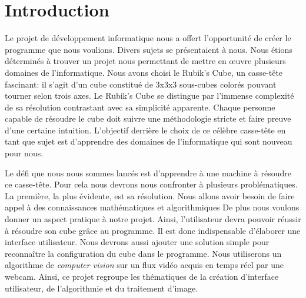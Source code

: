 \chapter*{Introduction}

Le projet de développement informatique nous a offert l'opportunité de créer le programme que nous voulions.
Divers sujets se présentaient à nous. Nous étions déterminés à trouver un projet nous permettant de mettre en œuvre plusieurs domaines de l'informatique.
Nous avons choisi le Rubik's Cube, un casse-tête fascinant: il s'agit d'un cube constitué de 3x3x3 sous-cubes colorés pouvant tourner selon trois axes.
Le Rubik's Cube se distingue par l'immense complexité de sa résolution contrastant avec sa simplicité apparente.
Chaque personne capable de résoudre le cube doit suivre une méthodologie stricte et faire preuve d'une certaine intuition.
L'objectif derrière le choix de ce célèbre casse-tête en tant que sujet est d'apprendre des domaines de l'informatique qui sont nouveau pour nous.

Le défi que nous nous sommes lancés est d'apprendre à une machine à résoudre ce casse-tête.
Pour cela nous devrons nous confronter à plusieurs problématiques.
La première, la plus évidente, est sa résolution. Nous allons avoir besoin de faire appel à des connaissances mathématiques et algorithmiques\cite{cite1}
De plus nous voulons donner un aspect pratique à notre projet. Ainsi, l'utilisateur devra pouvoir réussir à résoudre son cube grâce au programme.
Il est donc indispensable d'élaborer une interface utilisateur.
Nous devrons aussi ajouter une solution simple pour reconnaître la configuration du cube dans le programme. Nous utiliserons un algorithme de \textit{computer vision} sur un flux vidéo acquis en temps réel par une webcam.
Ainsi, ce projet regroupe les thématiques de la création d'interface utilisateur, de l'algorithmie et du traitement d'image.

